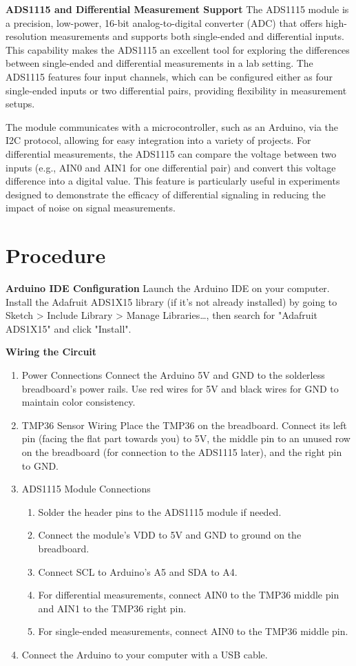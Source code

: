 \documentclass[a4paper,11pt]{article}%
\begin{document}
\textbf{ADS1115 and Differential Measurement Support}
The ADS1115 module is a precision, low-power, 16-bit analog-to-digital converter (ADC) that offers high-resolution measurements and supports both single-ended and differential inputs. This capability makes the ADS1115 an excellent tool for exploring the differences between single-ended and differential measurements in a lab setting. The ADS1115 features four input channels, which can be configured either as four single-ended inputs or two differential pairs, providing flexibility in measurement setups.

The module communicates with a microcontroller, such as an Arduino, via the I2C protocol, allowing for easy integration into a variety of projects. For differential measurements, the ADS1115 can compare the voltage between two inputs (e.g., AIN0 and AIN1 for one differential pair) and convert this voltage difference into a digital value. This feature is particularly useful in experiments designed to demonstrate the efficacy of differential signaling in reducing the impact of noise on signal measurements.


\section{Procedure}

\textbf{Arduino IDE Configuration}
Launch the Arduino IDE on your computer.
Install the Adafruit ADS1X15 library (if it's not already installed) by going to Sketch > Include Library > Manage Libraries…, then search for "Adafruit ADS1X15" and click "Install".


\textbf{Wiring the Circuit}
\begin{enumerate}
	\item Power Connections
	Connect the Arduino 5V and GND to the solderless breadboard's power rails. Use red wires for 5V and black wires for GND to maintain color consistency.
	\item TMP36 Sensor Wiring
	Place the TMP36 on the breadboard.
	Connect its left pin (facing the flat part towards you) to 5V, the middle pin to an unused row on the breadboard (for connection to the ADS1115 later), and the right pin to GND.
	\item ADS1115 Module Connections
	\begin{enumerate}
		\item Solder the header pins to the ADS1115 module if needed.
		\item Connect the module's VDD to 5V and GND to ground on the breadboard.
		\item Connect SCL to Arduino's A5 and SDA to A4.
		\item For differential measurements, connect AIN0 to the TMP36 middle pin and AIN1 to the TMP36 right pin.
		\item For single-ended measurements, connect AIN0 to the TMP36 middle pin.
	\end{enumerate}
	\item Connect the Arduino to your computer with a USB cable.
	
\end{enumerate}
\end{document}
